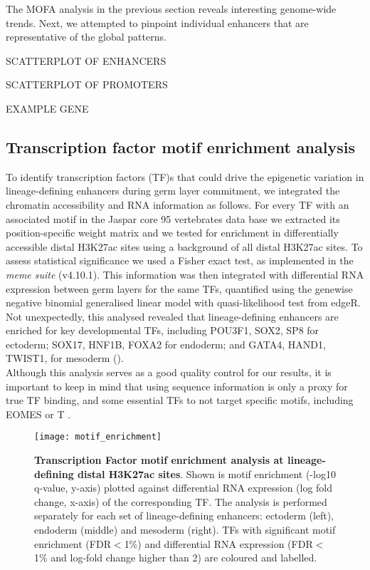 The MOFA analysis in the previous section reveals interesting genome-wide trends. Next, we attempted to pinpoint individual enhancers that are representative of the global patterns.

SCATTERPLOT OF ENHANCERS

SCATTERPLOT OF PROMOTERS

EXAMPLE GENE


\subsection{Transcription factor motif enrichment analysis}

To identify transcription factors (TF)s that could drive the epigenetic variation in lineage-defining enhancers during germ layer commitment, we integrated the chromatin accessibility and RNA information as follows. For every TF with an associated motif in the Jaspar core 95 vertebrates data base we extracted its position-specific weight matrix and we tested for enrichment in differentially accessible distal H3K27ac sites using a background of all distal H3K27ac sites. To assess statistical significance we used a Fisher exact test, as implemented in the \textit{meme suite} (v4.10.1). This information was then integrated with differential RNA expression between germ layers for the same TFs, quantified using the genewise negative binomial generalised linear model with quasi-likelihood test from edgeR. Not unexpectedly, this analysed revealed that lineage-defining enhancers are enriched for key developmental TFs, including POU3F1, SOX2, SP8 for ectoderm; SOX17, HNF1B, FOXA2 for endoderm; and GATA4, HAND1, TWIST1, for mesoderm ().\\
Although this analysis serves as a good quality control for our results, it is important to keep in mind that using sequence information is only a proxy for true TF binding, and some essential TFs to not target specific motifs, including EOMES or T \cite{Tosic2019}.

\begin{figure}[H]
	\centering
	\texttt{[image: motif\_enrichment]}
	\caption[]{
	\textbf{Transcription Factor motif enrichment analysis at lineage-defining distal H3K27ac sites}. Shown is motif enrichment (-log10 q-value, y-axis) plotted against differential RNA expression (log fold change, x-axis) of the corresponding TF. The analysis is performed separately for each set of lineage-defining enhancers: ectoderm (left), endoderm (middle) and mesoderm (right). TFs with significant motif enrichment (FDR$<$1\%) and differential RNA expression (FDR$<$1\% and log-fold change higher than 2) are coloured and labelled. }
	\label{fig:motif_enrichment}
\end{figure}


